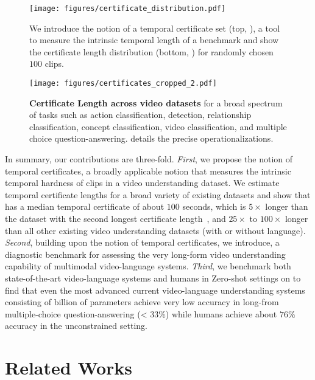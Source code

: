 \begin{figure}[t!]
\centering
\begin{minipage}[t]{0.45\linewidth}
  \texttt{[image: figures/certificate\_distribution.pdf]}
  \caption{We introduce the notion of a temporal certificate set (top, ), a tool to measure the intrinsic temporal length of a benchmark and show the \name{}{} certificate length distribution (bottom, ) for randomly chosen $100$ clips.}
  \label{fig:certificate_distribution}
\end{minipage}
\hspace{0.3cm}
\begin{minipage}[t]{0.45\linewidth}
  \texttt{[image: figures/certificates\_cropped\_2.pdf]}
  \caption{\textbf{Certificate Length across video datasets} for a broad spectrum of tasks such as action classification, detection, relationship classification, concept classification, video classification, and multiple choice question-answering.  details the precise operationalizations.}
  \label{fig:certificateplot}
\end{minipage}
\end{figure}

In summary, our contributions are three-fold. \textit{First}, we propose the notion of temporal certificates, a broadly applicable notion that measures the intrinsic temporal hardness of clips in a video understanding dataset. We estimate temporal certificate lengths for a broad variety of existing datasets and show that\name{}{} has a median temporal certificate of about $100$ seconds, which is $5\times$ longer than the dataset with the second longest certificate length~\cite{lvu}, and $25\times$ to $100\times$ longer than all other existing video understanding datasets (with or without language). \textit{Second}, building upon the notion of temporal certificates, we introduce\name{}{}, a diagnostic benchmark for assessing the very long-form video understanding capability of multimodal video-language systems. \textit{Third}, we benchmark both state-of-the-art video-language systems and humans in Zero-shot settings on\name{}{} to find that even the most advanced current video-language understanding systems consisting of billion of parameters achieve very low accuracy in long-from multiple-choice question-answering (< 33\%) while humans achieve about $76\%$ accuracy in the unconstrained setting. 
\section{Related Works}

